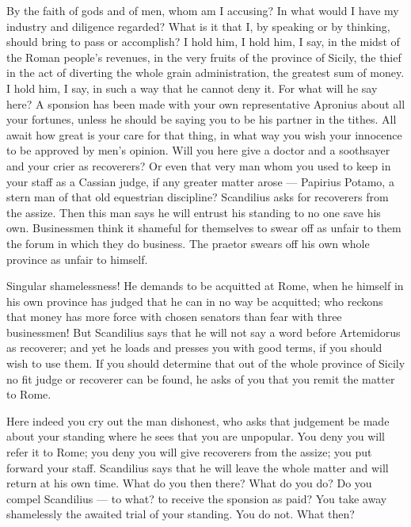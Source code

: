  By the faith of gods and of men, whom am I accusing? In what would I have my industry and diligence regarded? What is it that I, by speaking or by thinking, should bring to pass or accomplish? I hold him, I hold him, I say, in the midst of the Roman people's revenues, in the very fruits of the province of Sicily, the thief in the act of diverting the whole grain administration, the greatest sum of money. I hold him, I say, in such a way that he cannot deny it. For what will he say here? A sponsion has been made with your own representative Apronius about all your fortunes, unless he should be saying you to be his partner in the tithes. All await how great is your care for that thing, in what way you wish your innocence to be approved by men's opinion. Will you here give a doctor and a soothsayer and your crier as recoverers? Or even that very man whom you used to keep in your staff as a Cassian judge, if any greater matter arose --- Papirius Potamo, a stern man of that old equestrian discipline? Scandilius asks for recoverers from the assize. Then this man says he will entrust his standing to no one save his own. Businessmen think it shameful for themselves to swear off as unfair to them the forum in which they do business. The praetor swears off his own whole province as unfair to himself.

 Singular shamelessness! He demands to be acquitted at Rome, when he himself in his own province has judged that he can in no way be acquitted; who reckons that money has more force with chosen senators than fear with three businessmen! But Scandilius says that he will not say a word before Artemidorus as recoverer; and yet he loads and presses you with good terms, if you should wish to use them. If you should determine that out of the whole province of Sicily no fit judge or recoverer can be found, he asks of you that you remit the matter to Rome.

 Here indeed you cry out the man dishonest, who asks that judgement be made about your standing where he sees that you are unpopular. You deny you will refer it to Rome; you deny you will give recoverers from the assize; you put forward your staff. Scandilius says that he will leave the whole matter and will return at his own time. What do you then there? What do you do? Do you compel Scandilius --- to what? to receive the sponsion as paid? You take away shamelessly the awaited trial of your standing. You do not. What then?

